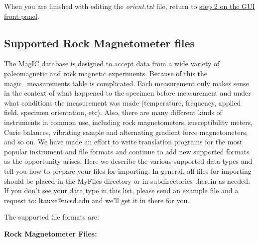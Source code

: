 \documentclass[11pt]{book}
\begin{document}
{{When you are finished with editing the {\it orient.txt} file,  return to  \href{#orient}{step 2 on the GUI front panel}.



\subsection{Supported Rock Magnetometer files}

The MagIC database is designed to accept data from a wide variety of paleomagnetic and rock magnetic experiments. Because of this the magic\_measurements table is complicated. Each measurement only makes sense in the context of what happened to the specimen before measurement and under what conditions the measurement was made (temperature, frequency, applied field, specimen orientation, etc). Also, there are many different kinds of instruments in common use, including rock magnetometers, susceptibility meters, Curie balances, vibrating sample and alternating gradient force magnetometers, and so on. We have made an effort to write translation programs for the most popular instrument and file formats and continue to add new supported formats as the opportunity arises. Here we describe the various supported data types and tell you how to prepare your files for importing. In general, all files for importing should be placed in the MyFiles directory or in subdirectories therein as needed.  If you don't see your data type in this list, please send an example file and a request to:  ltauxe@ucsd.edu and we'll get it in there for you.


The supported file formats are:

{\bf Rock Magnetometer Files:}

}}
\end{document}
